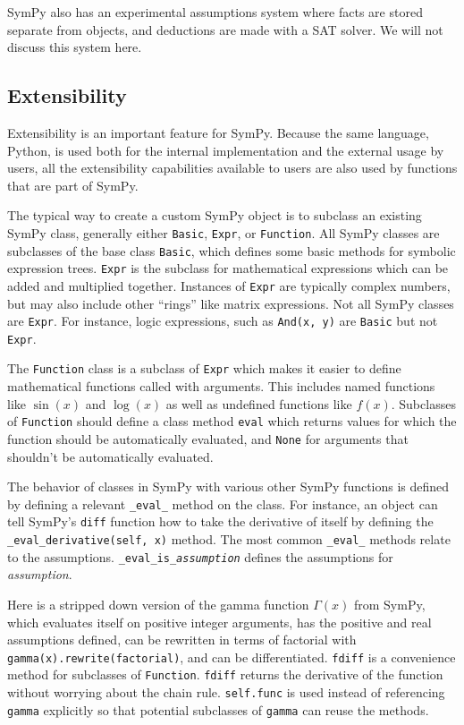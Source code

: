 SymPy also has an experimental assumptions system where facts are stored
separate from objects, and deductions are made with a SAT solver. We will not
discuss this system here.

\subsection{Extensibility}

Extensibility is an important feature for SymPy. Because the same language,
Python, is used both for the internal implementation and the external usage by
users, all the extensibility capabilities available to users are also used by
functions that are part of SymPy.

The typical way to create a custom SymPy object is to subclass an existing
SymPy class, generally either \texttt{Basic}, \texttt{Expr}, or
\texttt{Function}. All SymPy classes are subclasses of the base class
\texttt{Basic}, which defines some basic methods for symbolic expression
trees. \texttt{Expr} is the subclass for mathematical expressions which can be
added and multiplied together. Instances of \texttt{Expr} are typically
complex numbers, but may also include other ``rings'' like matrix expressions.
Not all SymPy classes are \texttt{Expr}. For instance, logic expressions, such
as \texttt{And(x, y)} are \texttt{Basic} but not \texttt{Expr}.

The \texttt{Function} class is a subclass of \texttt{Expr} which makes it
easier to define mathematical functions called with arguments. This includes
named functions like $\sin(x)$ and $\log(x)$ as well as undefined functions
like $f(x)$. Subclasses of \texttt{Function} should define a
class method \texttt{eval} which returns values for which the function should
be automatically evaluated, and \texttt{None} for arguments that shouldn't be
automatically evaluated.

The behavior of classes in SymPy with various other SymPy functions is defined
by defining a relevant \verb|_eval_| method on the class. For instance, an
object can tell SymPy's \texttt{diff} function how to take the derivative of
itself by defining the \verb|_eval_derivative(self, x)| method. The most
common \verb|_eval_| methods relate to the assumptions.
\verb|_eval_is_|\texttt{\textit{assumption}} defines the assumptions for
\textit{assumption}.

Here is a stripped down version of the gamma function $\Gamma(x)$ from SymPy,
which evaluates itself on positive integer arguments, has the positive and
real assumptions defined, can be rewritten in terms of factorial with
\texttt{gamma(x).rewrite(factorial)}, and can be differentiated.
\texttt{fdiff} is a convenience method for subclasses of \texttt{Function}.
\texttt{fdiff} returns the derivative of the function without worrying about
the chain rule. \texttt{self.func} is used instead of referencing
\texttt{gamma} explicitly so that potential subclasses of \texttt{gamma} can
reuse the methods.

